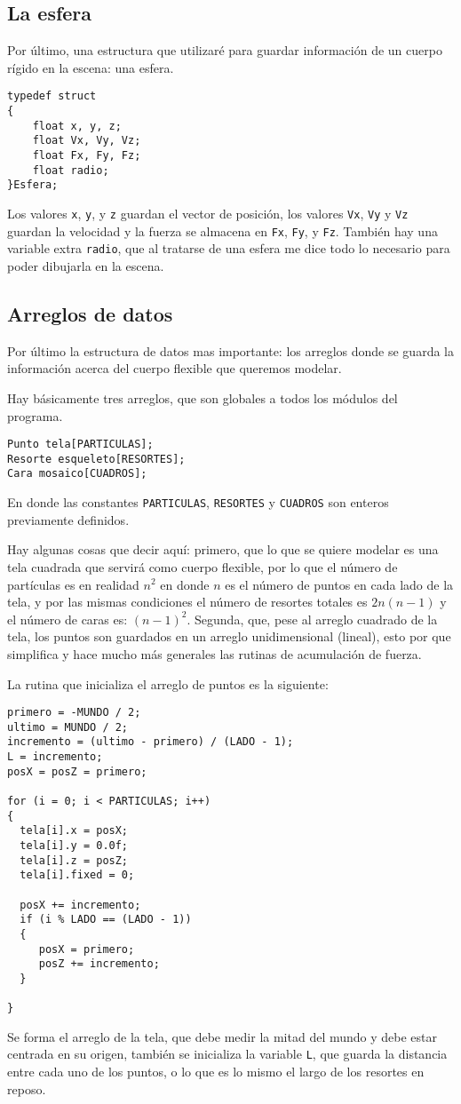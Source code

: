 \subsection{La esfera}
Por último, una estructura que utilizaré para guardar información de un cuerpo rígido en la escena: una esfera.
\begin{verbatim}
typedef struct
{
    float x, y, z;
    float Vx, Vy, Vz;
    float Fx, Fy, Fz;
    float radio;
}Esfera;
\end{verbatim} 
Los valores \verb|x|, \verb|y|, y \verb|z| guardan el vector de posición, los valores \verb|Vx|, \verb|Vy| y \verb|Vz| guardan la velocidad y la fuerza se almacena en \verb|Fx|, \verb|Fy|, y \verb|Fz|. También hay una variable extra \verb|radio|, que al tratarse de una esfera me dice todo lo necesario para poder dibujarla en la escena.

\subsection{Arreglos de datos}

Por último la estructura de datos mas importante: los arreglos donde se guarda la información acerca del cuerpo flexible que queremos modelar.

Hay básicamente tres arreglos, que son globales a todos los módulos del programa.
\begin{verbatim}
Punto tela[PARTICULAS];
Resorte esqueleto[RESORTES];
Cara mosaico[CUADROS];
\end{verbatim} 
En donde las constantes \verb|PARTICULAS|, \verb|RESORTES| y \verb|CUADROS| son enteros previamente definidos.

Hay algunas cosas que decir aquí: primero, que lo que se quiere modelar es una tela cuadrada que servirá como cuerpo flexible, por lo que el número de partículas es en realidad $n^{2}$ en donde $n$ es el número de puntos en cada lado de la tela, y por las mismas condiciones el número de resortes totales es $2 n (n - 1)$ y el número de caras es: $(n-1)^{2}$. Segunda, que, pese al arreglo cuadrado de la tela, los puntos son guardados en un arreglo unidimensional (lineal), esto por que simplifica y hace mucho más generales las rutinas de acumulación de fuerza.

La rutina que inicializa el arreglo de puntos es la siguiente:
\begin{verbatim}
primero = -MUNDO / 2;
ultimo = MUNDO / 2;
incremento = (ultimo - primero) / (LADO - 1);
L = incremento;
posX = posZ = primero;

for (i = 0; i < PARTICULAS; i++)
{
  tela[i].x = posX;
  tela[i].y = 0.0f;
  tela[i].z = posZ;
  tela[i].fixed = 0;

  posX += incremento;
  if (i % LADO == (LADO - 1))
  {
     posX = primero;
     posZ += incremento;
  }

}
\end{verbatim} 
Se forma el arreglo de la tela, que debe medir la mitad del mundo y debe estar centrada en su origen, también se inicializa la variable \verb|L|, que guarda la distancia entre cada uno de los puntos, o lo que es lo mismo el largo de los resortes en reposo.

